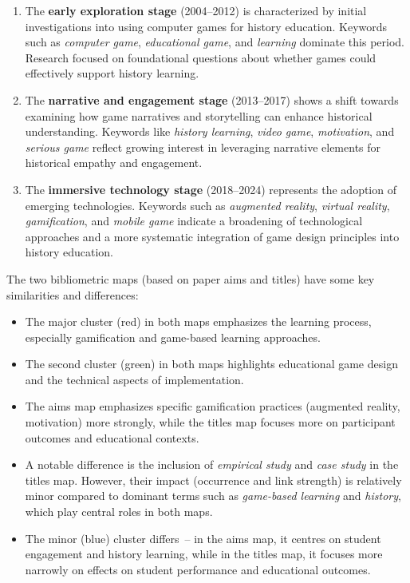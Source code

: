 \documentclass[a4paper,fleqn]{cas-sc}
\begin{document}
\begin{enumerate}[noitemsep]
 \item The \textbf{early exploration stage} (2004--2012) is characterized by initial investigations into using computer games for history education. Keywords such as \textit{computer game}, \textit{educational game}, and \textit{learning} dominate this period. Research focused on foundational questions about whether games could effectively support history learning.

 \item The \textbf{narrative and engagement stage} (2013--2017) shows a shift towards examining how game narratives and storytelling can enhance historical understanding. Keywords like \textit{history learning}, \textit{video game}, \textit{motivation}, and \textit{serious game} reflect growing interest in leveraging narrative elements for historical empathy and engagement.

 \item The \textbf{immersive technology stage} (2018--2024) represents the adoption of emerging technologies. Keywords such as \textit{augmented reality}, \textit{virtual reality}, \textit{gamification}, and \textit{mobile game} indicate a broadening of technological approaches and a more systematic integration of game design principles into history education.
\end{enumerate}


The two bibliometric maps (based on paper aims and titles) have some key similarities and differences:

\begin{itemize}[noitemsep]
 \item
The major cluster (red) in both maps emphasizes the learning process, especially gamification and game-based learning approaches.
 \item
The second cluster (green) in both maps highlights educational game design and the technical aspects of implementation.
 \item
The aims map emphasizes specific gamification practices (augmented reality, motivation) more strongly, while the titles map focuses more on participant outcomes and educational contexts.
 \item
A notable difference is the inclusion of \textit{empirical study} and \textit{case study} in the titles map. However, their impact (occurrence and link strength) is relatively minor compared to dominant terms such as \textit{game-based learning} and \textit{history}, which play central roles in both maps.
 \item
The minor (blue) cluster differs~-- in the aims map, it centres on student engagement and history learning, while in the titles map, it focuses more narrowly on effects on student performance and educational outcomes.
\end{itemize}
\end{document}
